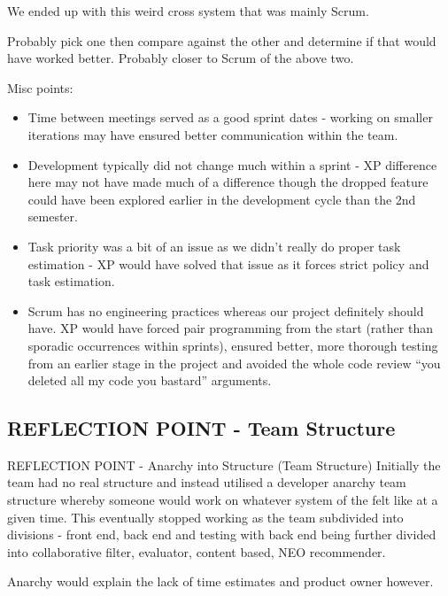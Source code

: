 \documentclass{l3proj}
\begin{document}
We ended up with this weird cross system that was mainly Scrum.

Probably pick one then compare against the other and determine if that would have worked better. Probably closer to Scrum of the above two.

Misc points:
\begin{itemize}
\item Time between meetings served as a good sprint dates - working on smaller iterations may have ensured better communication within the team.
\item Development typically did not change much within a sprint - XP difference here may not have made much of a difference though the dropped feature could have been explored earlier in the development cycle than the 2nd semester.
\item Task priority was a bit of an issue as we didn’t really do proper task estimation - XP would have solved that issue as it forces strict policy and task estimation.
\item Scrum has no engineering practices whereas our project definitely should have. XP would have forced pair programming from the start (rather than sporadic occurrences within sprints), ensured better, more thorough testing from an earlier stage in the project and avoided the whole code review “you deleted all my code you bastard” arguments.
\end{itemize}



\subsection{REFLECTION POINT - Team Structure}
\label{teamstructure}

REFLECTION POINT - Anarchy into Structure (Team Structure)
Initially the team had no real structure and instead utilised a developer anarchy team structure whereby someone would work on whatever system of the felt like at a given time. This eventually stopped working as the team subdivided into divisions - front end, back end and testing with back end being further divided into collaborative filter, evaluator, content based, NEO recommender.

Anarchy would explain the lack of time estimates and product owner however.
\end{document}
